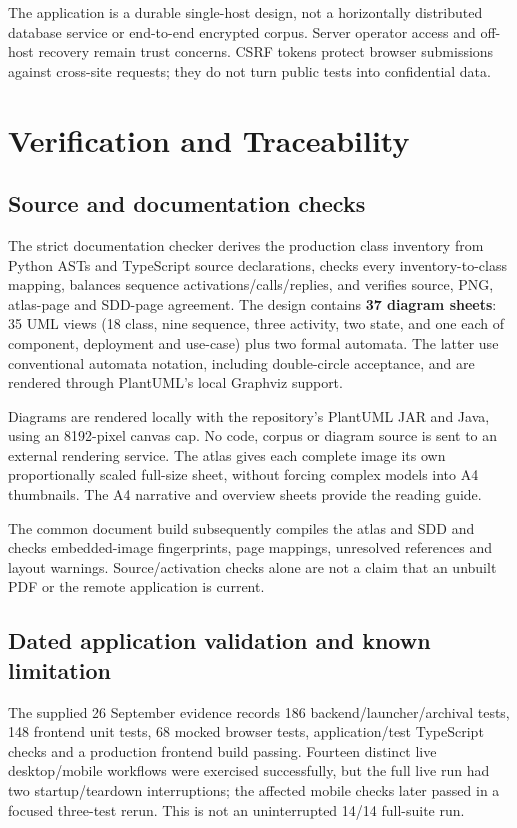 \documentclass[11pt,a4paper]{article}
\begin{document}
The application is a durable single-host design, not a horizontally distributed
database service or end-to-end encrypted corpus. Server operator access and
off-host recovery remain trust concerns. CSRF tokens protect browser submissions
against cross-site requests; they do not turn public tests into confidential data.

\section{Verification and Traceability}
\subsection{Source and documentation checks}
The strict documentation checker derives the production class inventory from
Python ASTs and TypeScript source declarations, checks every inventory-to-class
mapping, balances sequence activations/calls/replies, and verifies source,
PNG, atlas-page and SDD-page agreement. The design contains \textbf{37 diagram
sheets}: 35 UML views (18 class, nine sequence, three activity, two state, and
one each of component, deployment and use-case) plus two formal automata.
The latter use conventional automata notation, including double-circle
acceptance, and are rendered through PlantUML's local Graphviz support.

Diagrams are rendered locally with the repository's PlantUML JAR and Java,
using an 8192-pixel canvas cap. No code, corpus or diagram source is sent to an
external rendering service. The atlas gives each complete image its own
proportionally scaled full-size sheet, without forcing complex models into A4
thumbnails. The A4 narrative and overview sheets provide the reading guide.

The common document build subsequently compiles the atlas and SDD and checks
embedded-image fingerprints, page mappings, unresolved references and layout
warnings. Source/activation checks alone are not a claim that an unbuilt PDF
or the remote application is current.

\subsection{Dated application validation and known limitation}
The supplied 26 September evidence records 186 backend/launcher/archival tests,
148 frontend unit tests, 68 mocked browser tests, application/test TypeScript
checks and a production frontend build passing. Fourteen distinct live
desktop/mobile workflows were exercised successfully, but the full live run
had two startup/teardown interruptions; the affected mobile checks later passed
in a focused three-test rerun. This is not an uninterrupted 14/14 full-suite run.
\end{document}
